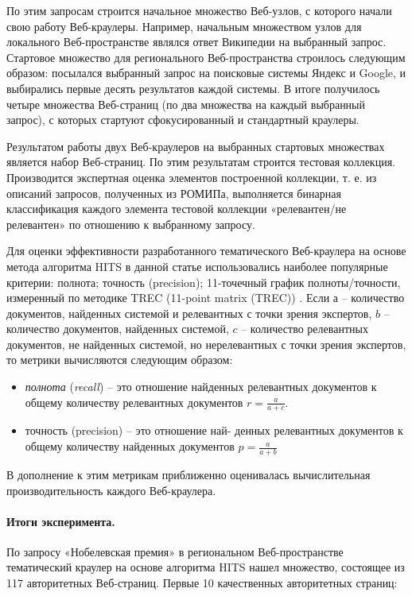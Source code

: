 По этим запросам строится начальное множество Веб-узлов, с которого начали свою работу Веб-краулеры. Например, начальным множеством узлов для локального Веб-пространстве являлся ответ Википедии на выбранный запрос. Стартовое множество для регионального Веб-пространства строилось следующим образом: посылался выбранный запрос на поисковые системы Яндекс и Google, и выбирались первые десять результатов каждой системы. В итоге получилось четыре множества Веб-страниц (по два множества на каждый выбранный запрос), с которых стартуют сфокусированный и стандартный краулеры.

Результатом работы двух Веб-краулеров на выбранных стартовых множествах является набор Веб-страниц. По этим результатам строится тестовая коллекция. Производится экспертная оценка элементов построенной коллекции, т. е. из описаний запросов, полученных из РОМИПа, выполняется бинарная классификация каждого элемента тестовой коллекции «релевантен/не релевантен» по отношению к выбранному запросу.

Для оценки эффективности разработанного тематического Веб-краулера на основе метода алгоритма HITS в данной статье использовались наиболее популярные критерии: полнота; точность (precision); 11-точечный график полноты/точности, измеренный по методике TREC (11-point matrix (TREC)) \cite{SmartEval,TREC2003,Zobel}. Если \(а\) -- количество документов, найденных системой и релевантных с точки зрения экспертов, \(b\) -- количество документов, найденных системой, \(c\) -- количество релевантных документов, не найденных системой, но нерелевантных с точки зрения экспертов, то метрики вычисляются следующим образом:

\begin{itemize}
	\item \textit{полнота} (\textit{recall}) -- это отношение найденных релевантных документов к общему количеству релевантных документов \(r = \frac{a}{a + c}\).
	\item точность (precision) – это отношение най- денных релевантных документов к общему количеству найденных документов \(p = \frac{a}{a + b}\)
\end{itemize}

В дополнение к этим метрикам приближенно оценивалась вычислительная производительность каждого Веб-краулера.

\paragraph{Итоги эксперимента.} По запросу «Нобелевская премия» в региональном Веб-пространстве тематический краулер на основе алгоритма HITS нашел множество, состоящее из 117 авторитетных Веб-страниц. Первые 10 качественных авторитетных страниц:

